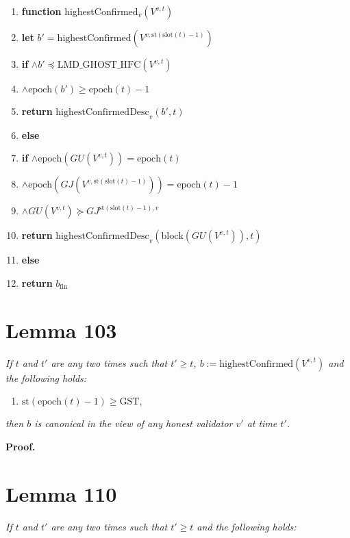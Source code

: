 \documentclass{article}
\begin{document}
\begin{enumerate}
    \item \textbf{function} highestConfirmed$_v(V^{v,t})$
    \item \quad \textbf{let} $b' = \text{highestConfirmed}(V^{v, \text{st}(\text{slot}(t) - 1)})$
    \item \quad \textbf{if} $\wedge b' \preceq \text{LMD\_GHOST\_HFC}(V^{v, t})$
    \item \quad \quad $\wedge \text{epoch}(b') \geq \text{epoch}(t) - 1$
    \item \quad \quad \quad \textbf{return} $\text{highestConfirmedDesc}_v(b', t)$
    \item \quad \textbf{else}
    \item \quad \quad \textbf{if} $\wedge \text{epoch}(GU(V^{v, t})) = \text{epoch}(t)$
    \item \quad \quad \quad $\wedge \text{epoch}(GJ(V^{v, \text{st}(\text{slot}(t) - 1)})) = \text{epoch}(t) - 1$
    \item \quad \quad \quad $\wedge GU(V^{v,t}) \succeq GJ^{\text{st}(\text{slot}(t) - 1), v}$
    \item \quad \quad \quad \quad \textbf{return} $\text{highestConfirmedDesc}_v(\text{block}(GU(V^{v,t})), t)$
    \item \quad \quad \textbf{else}
    \item \quad \quad \quad \textbf{return} $b_{\text{fin}}$
\end{enumerate}

\section*{Lemma 103}
\textit{If $t$ and $t'$ are any two times such that $t' \geq t$, $b := \text{highestConfirmed}(V^{v,t})$ and the following holds:}

\begin{enumerate}
    \item $\text{st}(\text{epoch}(t) - 1) \geq \text{GST},$
\end{enumerate}

\textit{then $b$ is canonical in the view of any honest validator $v'$ at time $t'$.}

\textbf{Proof.}

\section*{Lemma 110}
\textit{If $t$ and $t'$ are any two times such that $t' \geq t$ and the following holds:}
\end{document}
